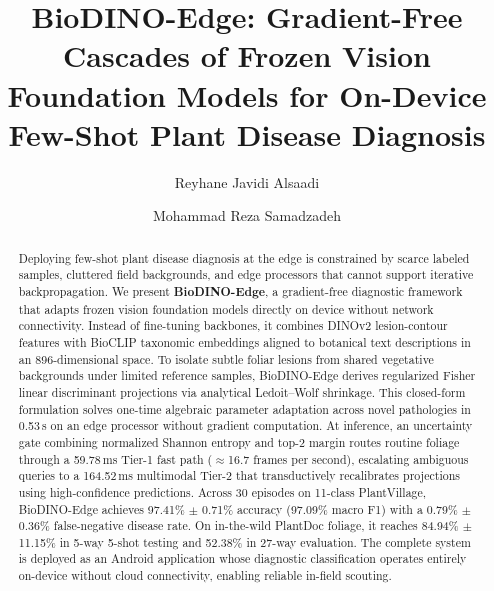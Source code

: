 \begin{frontmatter}

\title{BioDINO-Edge: Gradient-Free Cascades of Frozen Vision Foundation Models for On-Device Few-Shot Plant Disease Diagnosis}

\author[1]{Reyhane Javidi Alsaadi}

\author[1]{Mohammad Reza Samadzadeh}



\begin{abstract}
Deploying few-shot plant disease diagnosis at the edge is constrained by scarce labeled samples, cluttered field backgrounds, and edge processors that cannot support iterative backpropagation. We present \textbf{BioDINO-Edge}, a gradient-free diagnostic framework that adapts frozen vision foundation models directly on device without network connectivity. Instead of fine-tuning backbones, it combines DINOv2 lesion-contour features with BioCLIP taxonomic embeddings aligned to botanical text descriptions in an 896-dimensional space. To isolate subtle foliar lesions from shared vegetative backgrounds under limited reference samples, BioDINO-Edge derives regularized Fisher linear discriminant projections via analytical Ledoit--Wolf shrinkage. This closed-form formulation solves one-time algebraic parameter adaptation across novel pathologies in 0.53\,s on an edge processor without gradient computation. At inference, an uncertainty gate combining normalized Shannon entropy and top-2 margin routes routine foliage through a 59.78\,ms Tier-1 fast path ($\approx$16.7 frames per second), escalating ambiguous queries to a 164.52\,ms multimodal Tier-2 that transductively recalibrates projections using high-confidence predictions. Across 30 episodes on 11-class PlantVillage, BioDINO-Edge achieves 97.41\% $\pm$ 0.71\% accuracy (97.09\% macro F1) with a 0.79\% $\pm$ 0.36\% false-negative disease rate. On in-the-wild PlantDoc foliage, it reaches 84.94\% $\pm$ 11.15\% in 5-way 5-shot testing and 52.38\% in 27-way evaluation. The complete system is deployed as an Android application whose diagnostic classification operates entirely on-device without cloud connectivity, enabling reliable in-field scouting.
\end{abstract}


\end{frontmatter}
